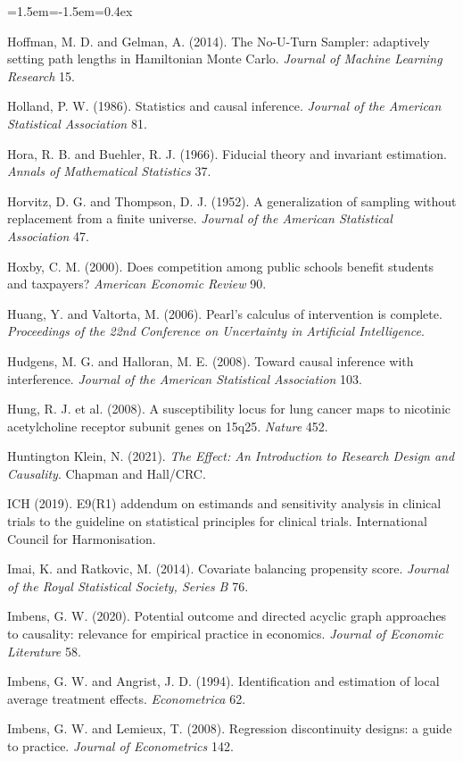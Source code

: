 \begin{list}{}{\leftmargin=1.5em\itemindent=-1.5em\itemsep=0.4ex}
\item Hoffman, M. D. and Gelman, A. (2014). The No-U-Turn Sampler: adaptively setting path lengths in Hamiltonian Monte Carlo. \emph{Journal of Machine Learning Research} 15.
\item Holland, P. W. (1986). Statistics and causal inference. \emph{Journal of the American Statistical Association} 81.
\item Hora, R. B. and Buehler, R. J. (1966). Fiducial theory and invariant estimation. \emph{Annals of Mathematical Statistics} 37.
\item Horvitz, D. G. and Thompson, D. J. (1952). A generalization of sampling without replacement from a finite universe. \emph{Journal of the American Statistical Association} 47.
\item Hoxby, C. M. (2000). Does competition among public schools benefit students and taxpayers? \emph{American Economic Review} 90.
\item Huang, Y. and Valtorta, M. (2006). Pearl's calculus of intervention is complete. \emph{Proceedings of the 22nd Conference on Uncertainty in Artificial Intelligence}.
\item Hudgens, M. G. and Halloran, M. E. (2008). Toward causal inference with interference. \emph{Journal of the American Statistical Association} 103.
\item Hung, R. J. et al. (2008). A susceptibility locus for lung cancer maps to nicotinic acetylcholine receptor subunit genes on 15q25. \emph{Nature} 452.
\item Huntington Klein, N. (2021). \emph{The Effect: An Introduction to Research Design and Causality}. Chapman and Hall/CRC.
\item ICH (2019). E9(R1) addendum on estimands and sensitivity analysis in clinical trials to the guideline on statistical principles for clinical trials. International Council for Harmonisation.
\item Imai, K. and Ratkovic, M. (2014). Covariate balancing propensity score. \emph{Journal of the Royal Statistical Society, Series B} 76.
\item Imbens, G. W. (2020). Potential outcome and directed acyclic graph approaches to causality: relevance for empirical practice in economics. \emph{Journal of Economic Literature} 58.
\item Imbens, G. W. and Angrist, J. D. (1994). Identification and estimation of local average treatment effects. \emph{Econometrica} 62.
\item Imbens, G. W. and Lemieux, T. (2008). Regression discontinuity designs: a guide to practice. \emph{Journal of Econometrics} 142.

\end{list}

